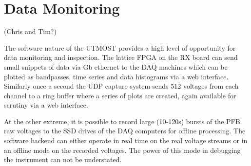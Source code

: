 \section{Data Monitoring }(Chris and Tim?)

The software nature of the UTMOST provides a high level of opportunity for data monitoring and inspection. The lattice FPGA on the RX board can send small snippets of data via Gb ethernet to the DAQ machines which can be plotted as bandpasses, time series and data histograms via a web interface. Similarly once a second the UDP capture system sends 512 voltages from each channel to a ring buffer where a series of plots are created, again available for scrutiny via a web interface.

At the other extreme, it is possible to record large (10-120s) bursts of the PFB raw voltages to the SSD drives of the DAQ computers for offline processing. The software backend can either operate in real time on the real voltage streams or in an offline mode on the recorded voltages. The power of this mode in debugging the instrument can not be understated. 
